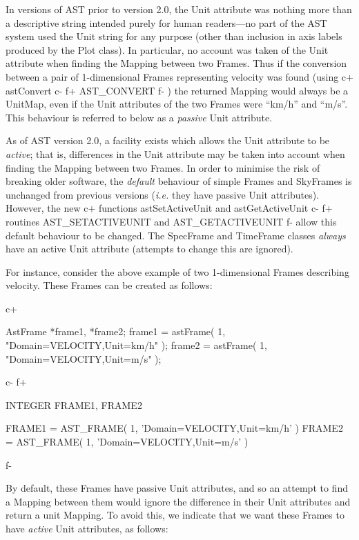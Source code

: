 \documentclass[twoside,11pt]{starlink}
\begin{document}
In versions of AST prior to version 2.0, the Unit attribute was nothing
more than a descriptive string intended purely for human readers---no
part of the AST system used the Unit string for any purpose (other than
inclusion in axis labels produced by the Plot class). In particular, no
account was taken of the Unit attribute when finding the Mapping between
two Frames. Thus if the conversion between a pair of 1-dimensional Frames
representing velocity was found (using
c+
astConvert
c-
f+
AST\_CONVERT
f-
) the returned Mapping would always be a UnitMap, even if the Unit
attributes of the two Frames were ``km/h'' and ``m/s''. This behaviour is
referred to below as a \emph{passive} Unit attribute.

As of AST version 2.0, a facility exists which allows the Unit attribute
to be \emph{active}; that is, differences in the
Unit attribute may be taken into account when finding the Mapping between
two Frames. In order to minimise the risk of breaking older software, the
\emph{default} behaviour of simple Frames and SkyFrames is unchanged from
previous versions (\emph{i.e.} they have passive Unit attributes). However,
the new
c+
functions astSetActiveUnit and astGetActiveUnit
c-
f+
routines AST\_SETACTIVEUNIT and AST\_GETACTIVEUNIT
f-
allow this default behaviour to be changed. The SpecFrame and TimeFrame
classes \emph{always} have an active Unit attribute (attempts to change this
are ignored).

For instance, consider the above example of two 1-dimensional Frames
describing velocity. These Frames can be created as follows:

c+
\small
\begin{terminalv}
AstFrame *frame1, *frame2;
frame1 = astFrame( 1, "Domain=VELOCITY,Unit=km/h" );
frame2 = astFrame( 1, "Domain=VELOCITY,Unit=m/s" );
\end{terminalv}
\normalsize
c-
f+
\small
\begin{terminalv}
      INTEGER FRAME1, FRAME2

      FRAME1 = AST_FRAME( 1, 'Domain=VELOCITY,Unit=km/h' )
      FRAME2 = AST_FRAME( 1, 'Domain=VELOCITY,Unit=m/s' )

\end{terminalv}
\normalsize
f-

By default, these Frames have passive Unit attributes, and so an attempt
to find a Mapping between them would ignore the difference in their Unit
attributes and return a unit Mapping. To avoid this, we indicate that we
want these Frames to have \emph{active} Unit attributes, as follows:
\end{document}
